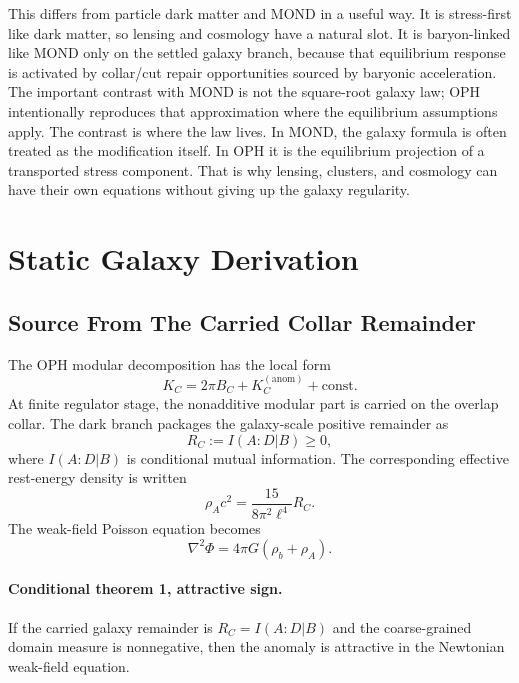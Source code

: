 \documentclass[11pt]{article}
\begin{document}
This differs from particle dark matter and MOND in a useful way.  It is
stress-first like dark matter, so lensing and cosmology have a natural slot.
It is baryon-linked like MOND only on the settled galaxy branch, because that
equilibrium response is activated by collar/cut repair opportunities sourced by
baryonic acceleration.  The important contrast with MOND is not the
square-root galaxy law; OPH intentionally reproduces that approximation where
the equilibrium assumptions apply.  The contrast is where the law lives.  In
MOND, the galaxy formula is often treated as the modification itself.  In OPH
it is the equilibrium projection of a transported stress component.  That is
why lensing, clusters, and cosmology can have their own equations without
giving up the galaxy regularity.

\section{Static Galaxy Derivation}

\subsection{Source From The Carried Collar Remainder}

The OPH modular decomposition has the local form
\begin{equation}
  K_C = 2\pi B_C + K_C^{(\mathrm{anom})}+\mathrm{const}.
\end{equation}
At finite regulator stage, the nonadditive modular part is carried on the
overlap collar.  The dark branch packages the galaxy-scale positive remainder
as
\begin{equation}
  R_C := I(A:D|B)\ge 0,
\end{equation}
where \(I(A:D|B)\) is conditional mutual information.  The corresponding
effective rest-energy density is written
\begin{equation}
  \rho_A c^2
    = \frac{15}{8\pi^2\ell^4} R_C.
  \label{eq:rhoA}
\end{equation}
The weak-field Poisson equation becomes
\begin{equation}
  \nabla^2 \Phi = 4\pi G(\rho_b+\rho_A).
  \label{eq:poisson}
\end{equation}

\paragraph{Conditional theorem 1, attractive sign.}
If the carried galaxy remainder is \(R_C=I(A:D|B)\) and the coarse-grained
domain measure is nonnegative, then the anomaly is attractive in the
Newtonian weak-field equation.
\end{document}
